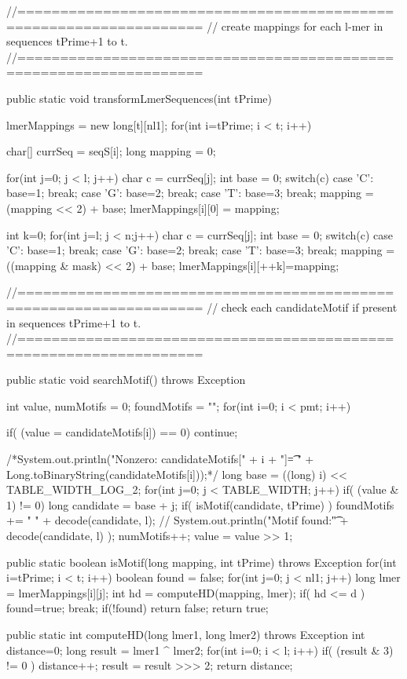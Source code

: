 \documentclass[oneside,12pt]{DISCSthesis}
\begin{document}
{\begin{footnotesize}
\begin{verbatimtab}[2]
{{{		}
	}

//===================================================================
// create mappings for each l-mer in sequences tPrime+1 to t.
//===================================================================

	public static void transformLmerSequences(int tPrime) {
		lmerMappings = new long[t][nl1];
		for(int i=tPrime; i < t; i++) {
			char[] currSeq = seqS[i];
			long mapping = 0;

			for(int j=0; j < l; j++) {
				char c = currSeq[j];
				int base = 0;
				switch(c) {
					case 'C': base=1; break;
					case 'G': base=2; break;
					case 'T': base=3; break;
				}
				mapping = (mapping << 2) + base;
			}
			lmerMappings[i][0] = mapping;

			int k=0;
			for(int j=l; j < n;j++) {
				char c = currSeq[j];
				int base = 0;
				switch(c) {
					case 'C': base=1; break;
					case 'G': base=2; break;
					case 'T': base=3; break;
				}
				mapping = ((mapping & mask) << 2) + base;
				lmerMappings[i][++k]=mapping;
			}

		}
	}

//===================================================================
// check each candidateMotif if present in sequences tPrime+1 to t.
//===================================================================

	public static void searchMotif() throws Exception {
		int value, numMotifs = 0;
		foundMotifs = "";
		for(int i=0; i < pmt; i++) {
			if( (value = candidateMotifs[i]) == 0)
				continue;

			/*System.out.println("Nonzero: candidateMotifs[" + i + "]\t= "
				+ Long.toBinaryString(candidateMotifs[i]));*/
			long base = ((long) i) << TABLE_WIDTH_LOG_2;
			for(int j=0; j < TABLE_WIDTH; j++) {
				if( (value & 1) != 0) {
					long candidate = base + j;
					if( isMotif(candidate, tPrime) ) {
						foundMotifs += " " + decode(candidate, l);
						// System.out.println("Motif found:\t" + decode(candidate, l) );
						numMotifs++;
					}
				}
				value = value >> 1;
			}
		}
	}

	public static boolean isMotif(long mapping, int tPrime) throws Exception {
		for(int i=tPrime; i < t; i++) {
			boolean found = false;
			for(int j=0; j < nl1; j++) {
				long lmer = lmerMappings[i][j];
				int hd = computeHD(mapping, lmer);
				if( hd <= d ) {
					found=true;
					break;
				}
			}
			if(!found) {
				return false;
			}
		}
		return true;
	}

	public static int computeHD(long lmer1, long lmer2) throws Exception {
		int distance=0;
		long result = lmer1 ^ lmer2;
		for(int i=0; i < l; i++) {
			if( (result & 3) != 0 )
				distance++;
			result = result >>> 2;
		}
		return distance;
	}

}
\end{verbatimtab}
\end{footnotesize}}
\end{document}

